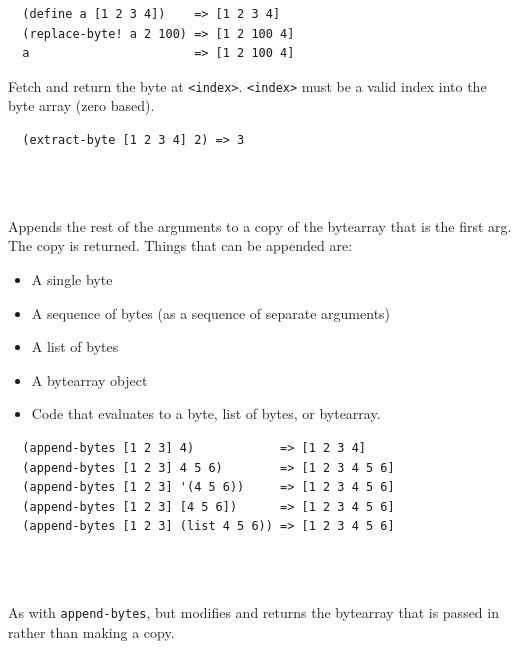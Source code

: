 \documentclass[12pt]{article}
\begin{document}
\begin{verbatim}
  (define a [1 2 3 4])    => [1 2 3 4]
  (replace-byte! a 2 100) => [1 2 100 4]
  a                       => [1 2 100 4]

\end{verbatim}


Fetch and return the byte at \verb|<index>|.
\verb|<index>| must be a valid index into the byte array (zero based).

\begin{verbatim}
  (extract-byte [1 2 3 4] 2) => 3
\end{verbatim}

\\
\\

Appends the rest of the arguments to a copy of the bytearray that is the first
arg. The copy is returned. Things that can be appended are:
\begin{itemize}
\item A single byte
\item A sequence of bytes (as a sequence of separate arguments)
\item A list of bytes
\item A bytearray object
\item Code that evaluates to a byte, list of bytes, or bytearray.
\end{itemize}

\begin{verbatim}
  (append-bytes [1 2 3] 4)            => [1 2 3 4]
  (append-bytes [1 2 3] 4 5 6)        => [1 2 3 4 5 6]
  (append-bytes [1 2 3] '(4 5 6))     => [1 2 3 4 5 6]
  (append-bytes [1 2 3] [4 5 6])      => [1 2 3 4 5 6]
  (append-bytes [1 2 3] (list 4 5 6)) => [1 2 3 4 5 6]
\end{verbatim}

\\
\\

As with \verb|append-bytes|, but modifies and returns the bytearray
that is passed in rather than making a copy.
\end{document}
